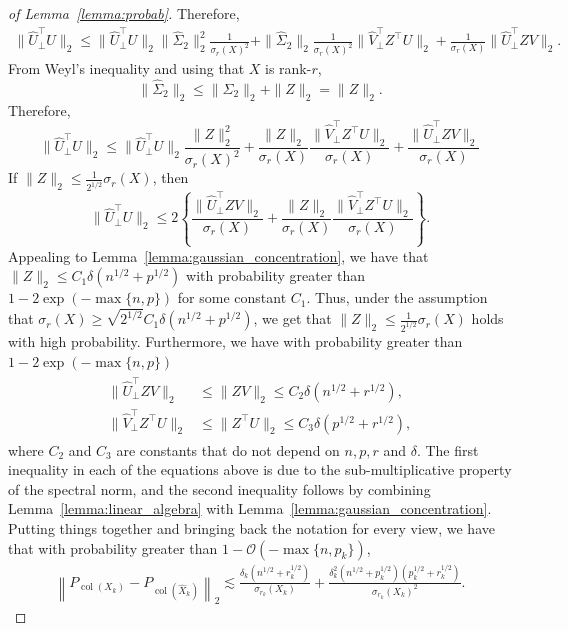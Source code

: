 \documentclass{amsart}
\DeclareMathOperator*{\col}{col}
\begin{document}
\begin{proof}[of Lemma~\ref{lemma:probab}]
{Therefore, 
\begin{align*}
\|\widehat U_{\perp}^{\top}U\|_2 \leq \|\widehat U_{\perp}^{\top}U\|_2 \|\widehat \Sigma_2\|_2^2\frac1{\sigma_r(X)^2} + \|\widehat \Sigma_2\|_2\frac1{\sigma_r(X)^2}\|\widehat V_{\perp}^{\top}Z^{\top}U\|_2 + \frac1{\sigma_r(X)}\|\widehat U_{\perp}^{\top}ZV\|_2.
\end{align*}
From Weyl's inequality and using that $X$ is rank-$r$,
$$
\|\widehat \Sigma_2\|_2\leq \|\Sigma_2\|_2 + \|Z\|_2 = \|Z\|_2.
$$
Therefore,
$$
\|\widehat U_{\perp}^{\top}U\|_2 \leq \|\widehat U_{\perp}^{\top}U\|_2 \frac{\|Z\|_2^2}{\sigma_r(X)^2} + \frac{\|Z\|_2}{\sigma_r(X)}\frac{\|\widehat V_{\perp}^{\top}Z^{\top}U\|_2}{\sigma_r(X)} + \frac{\|\widehat U_{\perp}^{\top}ZV\|_2}{\sigma_r(X)}
$$
If $\|Z\|_2\leq \frac{1}{2^{1/2}}\sigma_r(X)$, then
$$
\|\widehat U_{\perp}^{\top}U\|_2 \leq 2\left\{ \frac{\|\widehat U_{\perp}^{\top}ZV\|_2}{\sigma_r(X)} + \frac{\|Z\|_2}{\sigma_r(X)}\frac{\|\widehat V_{\perp}^{\top}Z^{\top}U\|_2}{\sigma_r(X)}\right\}.
$$
Appealing to Lemma~\ref{lemma:gaussian_concentration}, we have that $\|Z\|_2 \leq C_1\delta(n^{1/2}+p^{1/2})$ with probability greater than $1-2\exp(-\max\{n,p\})$ for some constant $C_1$. Thus, under the assumption that $\sigma_r(X)\geq \sqrt{2^{1/2}}C_1\delta(n^{1/2} + p^{1/2})$, we get that $\|Z\|_2\leq \frac1{2^{1/2}}\sigma_r(X)$ holds with high probability. Furthermore, we have with probability greater than $1-2\exp(-\max\{n,p\})$
\begin{eqnarray*}
\begin{aligned}
\|\widehat U_{\perp}^{\top}ZV\|_2 &\leq \|ZV\|_2 \leq C_2\delta(n^{1/2}+r^{1/2}),\\
\|\widehat V_{\perp}^{\top}Z^\top{U}\|_2 &\leq \|Z^\top{U}\|_2 \leq C_3\delta(p^{1/2}+r^{1/2}),
\end{aligned}
\end{eqnarray*}
where $C_2$ and $C_3$ are constants that do not depend on $n,p,r$ and $\delta$. The first inequality in each of the equations above is due to the sub-multiplicative property of the spectral norm, and the second inequality follows by combining Lemma~\ref{lemma:linear_algebra} with Lemma~\ref{lemma:gaussian_concentration}. Putting things together and bringing back the notation for every view, we have that with probability greater than $1-\mathcal{O}(-\max\{n,p_k\})$, 
\begin{eqnarray}
\left\|P_{{\col (X_k)}} - P_{\col (\widehat X_k)}\right\|_2 \lesssim \frac{\delta_k(n^{1/2}+r_k^{1/2})}{\sigma_{r_k}(X_k)}+ \frac{\delta_k^2(n^{1/2} + p_k^{1/2})(p_k^{1/2}+r_k^{1/2})}{\sigma_{r_k}(X_k)^2}.
\label{eqn:equaiton_inter}
\end{eqnarray}

}
\end{proof}
\end{document}
